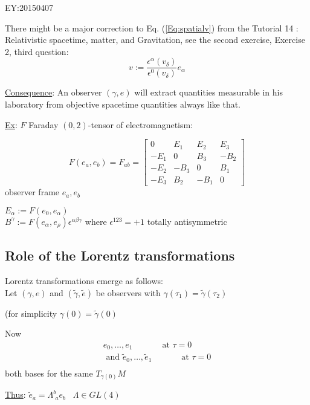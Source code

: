 \documentclass[10pt, twoside]{amsart}
\begin{document}
\begin{multicols*}{2}
EY:20150407

There might be a major correction to Eq. (\ref{Eq:spatialv}) from the Tutorial 14 : Relativistic spacetime, matter, and Gravitation, see the second exercise, Exercise 2, third question:
\begin{equation}
v := \frac{ \epsilon^{\alpha}({v}_{\delta} ) }{ \epsilon^0({v}_{\delta}) } e_{\alpha}
\end{equation}

\underline{Consequence}:
An observer $(\gamma, e)$ will extract quantities measurable in his laboratory from objective spacetime quantities always like that.

\underline{Ex}: $F$ Faraday $(0,2)$-tensor of electromagnetism:

\[
F(e_a,e_b) = F_{ab} = \left[ \begin{matrix} 0 & E_1 & E_2 & E_3 \\ 
    -E_1 & 0 & B_3 & -B_2 \\ 
    -E_2 & -B_3 & 0 & B_1 \\
    -E_3 & B_2 & -B_1 & 0 \end{matrix} \right]
\]
observer frame $e_a,e_b$

$E_{\alpha} := F(e_0,e_{\alpha})$ \\
$B^{\gamma}:= F(e_{\alpha},e_{\rho})\epsilon^{\alpha \beta \gamma}$
where 
$\epsilon^{123} = +1$ totally antisymmetric

\subsection{Role of the Lorentz transformations}

Lorentz transformations emerge as follows: \\
Let $(\gamma,e)$ and $(\widetilde{\gamma},\widetilde{e})$ be observers with $\gamma(\tau_1) = \widetilde{\gamma}(\tau_2)$

(for simplicity $\gamma(0) = \widetilde{\gamma}(0)$

Now 
\[
\begin{gathered}
  e_0 , \dots , e_1 \quad \quad \quad \, \text{ at } \tau = 0 \\
  \text{ and } 
  \widetilde{e}_0 , \dots , \widetilde{e}_1 \quad \quad \quad \, \text{ at }  \tau = 0 \\
\end{gathered}
\]
both bases for the same $T_{\gamma(0)}M$

\underline{Thus}: $\widetilde{e}_a = \Lambda^b_{ \, \, a} e_b $ \quad \quad \, $\Lambda \in GL(4)$


\end{multicols*}
\end{document}
